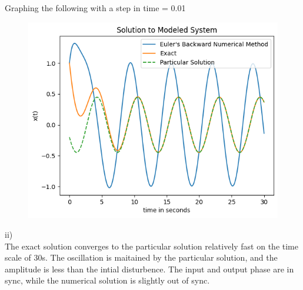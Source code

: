 \documentclass[12pt]{exam}
\begin{document}
\begin{questions}
\pagebreak
Graphing the following with a step in time = 0.01 \\
\begin{figure}[h]
\includegraphics[width = \linewidth]{Comparing-solutions-graph.png}  
\centering
\end{figure}
ii) \\
The exact solution converges to the particular solution relatively fast on the time scale of 30s. 
The oscillation is maitained by the particular solution, and the amplitude is less than the intial disturbence.
The input and output phase are in sync, while the numerical solution is slightly out of sync.

\end{questions}
\end{document}

